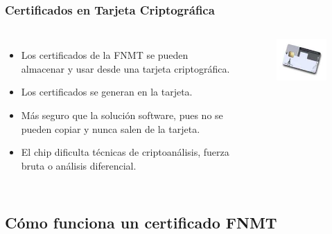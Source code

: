 \documentclass{beamer}
\begin{document}

\begin{frame}
\frametitle{Certificados en Tarjeta Criptográfica}


\begin{columns}

\column[t]{9cm}

\begin{itemize}
\item Los certificados de la FNMT se pueden almacenar y usar desde una tarjeta criptográfica.
\item Los certificados se generan en la tarjeta.
\item Más seguro que la solución software, pues no se pueden copiar y nunca salen de la tarjeta.
\item El chip dificulta técnicas de criptoanálisis, fuerza bruta o análisis diferencial.
\end{itemize}

\column[t]{3cm}
\vspace{1cm}
\begin{figure}
	\begin{flushleft}
	\includegraphics[scale=2.0,clip=true]{figs/criptografica.jpg} 	
	\end{flushleft}
\end{figure}


\end{columns}

\end{frame}

\subsection{Cómo funciona un certificado FNMT}
\end{document}
